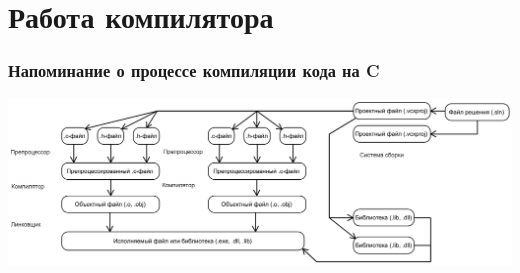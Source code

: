 \documentclass{../../slides-style}
\begin{document}
    
    \begin{frame}[plain]
        \titlepage
    \end{frame}

    \section{Работа компилятора}

    \begin{frame}
        \frametitle{Напоминание о процессе компиляции кода на C}
        \begin{center}
            \includegraphics[height=0.4\textheight]{compilation.png}
        \end{center}
    \end{frame}
\end{document}
